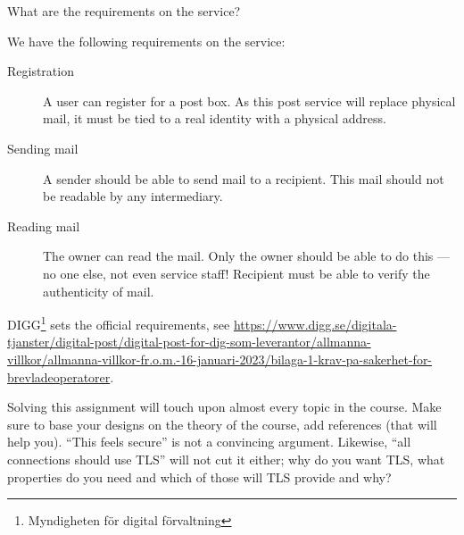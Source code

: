 \begin{frame}
\begin{exercise}[Requirements]
  What are the requirements on the service?
\end{exercise}
\end{frame}

We have the following requirements on the service:
\begin{frame}
\begin{description}
  \item[Registration]
    A user can register for a post box.
    As this post service will replace physical mail, it must be tied to a real 
    identity with a physical address.

    \pause

  \item[Sending mail]
    A sender should be able to send mail to a recipient.
    This mail should not be readable by any intermediary.

  \item[Reading mail]
    The owner can read the mail.
    Only the owner should be able to do this --- no one else, not even service 
    staff!
    Recipient must be able to verify the authenticity of mail.
%
\end{description}
\end{frame}

\begin{frame}
  \begin{remark}
    DIGG\footnote{Myndigheten för digital förvaltning} sets the official 
    requirements, see
    \url{https://www.digg.se/digitala-tjanster/digital-post/digital-post-for-dig-som-leverantor/allmanna-villkor/allmanna-villkor-fr.o.m.-16-januari-2023/bilaga-1-krav-pa-sakerhet-for-brevladeoperatorer}.
  \end{remark}
\end{frame}

Solving this assignment will touch upon almost every topic in the course.
Make sure to base your designs on the theory of the course, add references 
(that will help you).
\enquote{This feels secure} is not a convincing argument.
Likewise, \enquote{all connections should use TLS} will not cut it either; why 
do you want TLS, what properties do you need and which of those will TLS 
provide and why?

